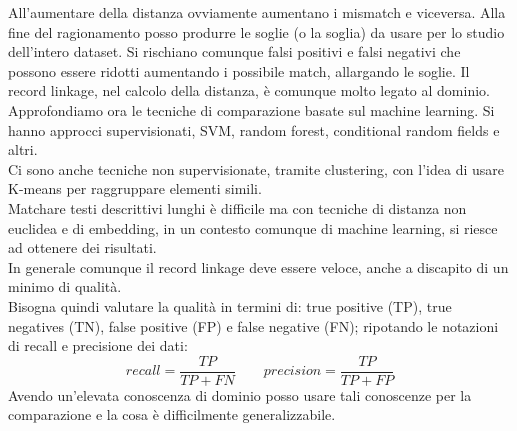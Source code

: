 All'aumentare della distanza ovviamente aumentano i mismatch e viceversa. Alla fine del ragionamento posso produrre le soglie (o la soglia) da usare per lo studio dell'intero dataset.  Si rischiano comunque falsi positivi e falsi negativi che possono essere ridotti aumentando i possibile match, allargando le soglie. Il record linkage, nel calcolo della distanza, è comunque molto legato al dominio.\\ 

Approfondiamo ora le tecniche di comparazione basate sul machine learning. Si hanno approcci supervisionati, SVM, random forest, conditional random fields e altri. \\ 
Ci sono anche tecniche non supervisionate, tramite clustering, con l'idea di usare K-means per raggruppare elementi simili.\\ Matchare testi descrittivi lunghi è difficile ma con tecniche di distanza non euclidea e di embedding, in un contesto comunque di machine learning, si riesce ad ottenere dei risultati.\\ In generale comunque il record linkage deve essere veloce, anche a discapito di un minimo di qualità.\\
Bisogna quindi valutare la qualità in termini di: true positive (TP), true negatives (TN), false positive (FP) e false negative (FN); ripotando le notazioni di recall e precisione dei dati:
\[recall=\frac{TP}{TP+FN} \qquad precision=\frac{TP}{TP+FP}\]
Avendo un'elevata conoscenza di dominio posso usare tali conoscenze per la comparazione e la cosa è difficilmente generalizzabile.

